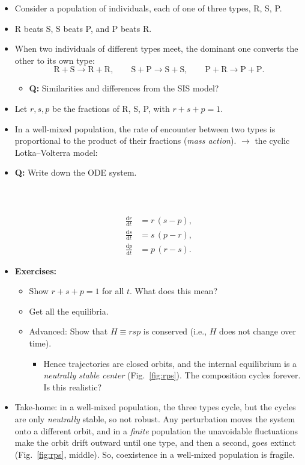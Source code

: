 \documentclass[20pt]{extarticle}
\begin{document}
\begin{itemize}
\item Consider a population of individuals, each of one of three types, R, S, P.
\item R beats S, S beats P, and P beats R.
\item When two individuals of different types meet, the dominant one converts the other to its own type:
\[ \text{R} + \text{S} \to \text{R} + \text{R}, \qquad \text{S} + \text{P} \to \text{S} + \text{S}, \qquad \text{P} + \text{R} \to \text{P} + \text{P}. \]
	\begin{itemize}
	\item \textbf{Q:} Similarities and differences from the SIS model?
	\end{itemize}
\item Let $r,s,p$ be the fractions of R, S, P, with $r+s+p=1$.
\item In a well-mixed population, the rate of encounter between two types is proportional to the product of their fractions (\emph{mass action}). $\to$ the
cyclic Lotka--Volterra model:
\item \textbf{Q:} Write down the ODE system.
\ \\
\ \\
\ \\
\ \\
\[
\begin{aligned}
\frac{\text{d}r}{\text{d}t} &= r\,(s - p),\\
\frac{\text{d}s}{\text{d}t} &= s\,(p - r),\\
\frac{\text{d}p}{\text{d}t} &= p\,(r - s).
\end{aligned}
\]
\item \textbf{Exercises:}
	\begin{itemize}
	\item Show $r+s+p=1$ for all $t$. What does this mean?
	\item Get all the equilibria.
	\item Advanced: Show that $H \equiv rsp$ is conserved (i.e., $H$ does not change over time).
		\begin{itemize}
		\item Hence trajectories are closed orbits, and the internal equilibrium is a \emph{neutrally stable center} (Fig.~\ref{fig:rps}). The composition cycles forever. Is this realistic?
		\end{itemize}
	\end{itemize}
\item Take-home: in a well-mixed population, the three types cycle, but the cycles are only \emph{neutrally} stable, so not robust. Any perturbation moves the system onto a different orbit, and in a \emph{finite} population the unavoidable fluctuations make the orbit drift outward until one type, and then a second, goes extinct (Fig.~\ref{fig:rps}, middle). So, coexistence in a well-mixed population is fragile.
\end{itemize}
\end{document}

